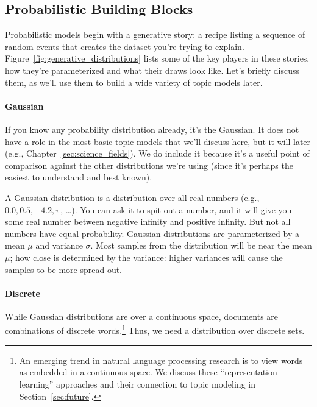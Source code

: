 \begin{figure}
  \caption{}
  \label{fig:distribution_examples}
\end{figure}

\subsection{Probabilistic Building Blocks}

Probabilistic models begin with a generative story: a recipe listing a sequence of random events
that creates the dataset you're trying to explain.
Figure~\ref{fig:generative_distributions} lists some of the key players in these
stories, how they're parameterized and what their draws look like.  Let's
briefly discuss them, as we'll use them to build a wide variety of topic models
later.

\paragraph{Gaussian} If you know any probability distribution already, it's the
Gaussian.  It does not have a role in the most basic topic models that we'll
discuss here, but it will later (e.g., Chapter~\ref{sec:science_fields}).  We do
include it because it's a useful point of comparison against the other
distributions we're using (since it's perhaps the easiest to understand and best
known).

A Gaussian distribution is a distribution over all real numbers (e.g., $0.0, 0.5,
-4.2, \pi$, \dots).  You can ask it to spit out a number, and it will give you
some real number between negative infinity and positive infinity.  But not all
numbers have equal probability.  Gaussian distributions are parameterized by a
mean $\mu$ and variance $\sigma$.  Most samples from the distribution will be
near the mean $\mu$; how close is determined by the variance: higher variances
will cause the samples to be more spread out.

\paragraph{Discrete}

While Gaussian distributions are over a continuous space, documents are
combinations of discrete words.\footnote{An emerging trend in natural language
  processing research is to view words as embedded in a continuous space.  We
  discuss these ``representation learning'' approaches and their connection to
  topic modeling in Section~\ref{sec:future}.}   Thus, we need a distribution
over discrete sets.

